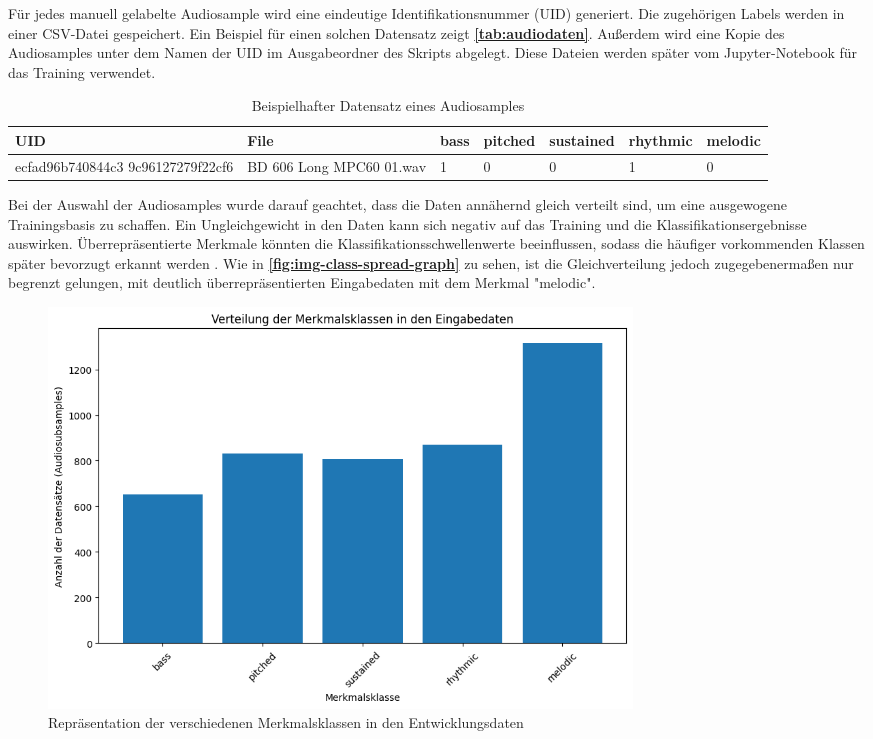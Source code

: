 Für jedes manuell gelabelte Audiosample wird eine eindeutige Identifikationsnummer (UID) generiert. Die zugehörigen Labels werden in einer CSV-Datei gespeichert. Ein Beispiel für einen solchen Datensatz zeigt \textbf{\autoref{tab:audiodaten}}. Außerdem wird eine Kopie des Audiosamples unter dem Namen der UID im Ausgabeordner des Skripts abgelegt. Diese Dateien werden später vom Jupyter-Notebook für das Training verwendet.

\begin{table}[h!]
\centering
\begin{tabular}{|m{2.8cm}|m{4.5cm}|m{0.8cm}|m{1.2cm}|m{1.5cm}|m{1.5cm}|m{1.3cm}|}
\hline
\textbf{UID} & \textbf{File} & \textbf{bass} & \textbf{pitched} & \textbf{sustained} & \textbf{rhythmic} & \textbf{melodic} \\ \hline
ecfad96b740844c3
9c96127279f22cf6 &  BD 606 Long MPC60 01.wav & 1 & 0 & 0 & 1 & 0 \\ \hline
\end{tabular}
\caption{Beispielhafter Datensatz eines Audiosamples}
\label{tab:audiodaten}
\end{table}

Bei der Auswahl der Audiosamples wurde darauf geachtet, dass die Daten annähernd gleich verteilt sind, um eine ausgewogene Trainingsbasis zu schaffen. Ein Ungleichgewicht in den Daten kann sich negativ auf das Training und die Klassifikationsergebnisse auswirken. Überrepräsentierte Merkmale könnten die Klassifikationsschwellenwerte beeinflussen, sodass die häufiger vorkommenden Klassen später bevorzugt erkannt werden \cite{nn-imbalance-input-data}. Wie in \textbf{\autoref{fig:img-class-spread-graph}} zu sehen, ist die Gleichverteilung jedoch zugegebenermaßen nur begrenzt gelungen, mit deutlich überrepräsentierten Eingabedaten mit dem Merkmal "melodic".

\begin{figure}[h!]
\centering
\includegraphics[width=0.75\textwidth]{images/08_durchfuehrung/nn/class_spread_plot.png}
\caption{Repräsentation der verschiedenen Merkmalsklassen in den Entwicklungsdaten}
\label{fig:img-class-spread-graph}
\end{figure}

